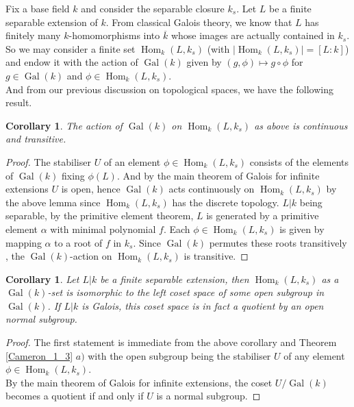 \documentclass{article}
\theoremstyle{plain}
\newtheorem{corollary}[theorem]{Corollary}
\theoremstyle{definition}
\DeclareMathOperator{\Hom}{Hom}
\DeclareMathOperator{\Gal}{Gal}
\begin{document}
\noindent Fix a base field $k$ and consider the separable closure $k_s$. Let $L$ be a finite separable extension of $k$.
From classical Galois theory, we know that $L$ has finitely many $k$-homomorphisms into $\overline{k}$ whose images are actually contained in $k_s$. 
So we may consider a finite set $\Hom_k(L,k_s)$ (with $|\Hom_k(L,k_s)|=[L:k]$) and endow it with the action of $\Gal(k)$ given by $(g,\phi)\mapsto g\circ \phi$ for $g\in\Gal(k)$ and $\phi\in\Hom_k(L,k_s)$. \\







\noindent And from our previous discussion on topological spaces, we have the following result.

\begin{corollary}
    The action of $\Gal(k)$ on $\Hom_k(L,k_s)$ as above is continuous and transitive.
\end{corollary}
\begin{proof}
    The stabiliser $U$ of an element $\phi\in\Hom_k(L,k_s)$ consists of the elements of $\Gal(k)$ fixing $\phi(L)$. And by the main theorem of Galois for infinite extensions $U$ is open, hence $\Gal(k)$ acts continuously on $\Hom_k(L,k_s)$ by the above lemma since $\Hom_k(L,k_s)$ has the discrete topology.
    $L|k$ being separable, by the primitive element theorem, $L$ is generated by a primitive element $\alpha$ with minimal polynomial $f$. Each $\phi\in\Hom_k(L,k_s)$ is given by mapping $\alpha$ to a root of $f$ in $k_s$. Since $\Gal(k)$ permutes these roots transitively , the $\Gal(k)$-action on $\Hom_k(L,k_s)$ is transitive.
\end{proof}

\begin{corollary}
\label{Galois_normal_reformulation}
    Let $L|k$ be a finite separable extension, then $\Hom_k(L,k_s)$ as a $\Gal(k)$-set is isomorphic to the left coset space of some open subgroup in $\Gal(k)$.
    If $L|k$ is Galois, this coset space is in fact a quotient by an open normal subgroup.
\end{corollary}
\begin{proof}
    The first statement is immediate from the above corollary and Theorem \ref{Cameron_1_3} $a)$  with the open subgroup being the stabiliser $U$ of any element $\phi\in\Hom_k(L,k_s)$.\\
    By the main theorem of Galois for infinite extensions, the coset $U/\Gal(k)$ becomes a quotient if and only if $U$ is a normal subgroup.
\end{proof}
\end{document}
